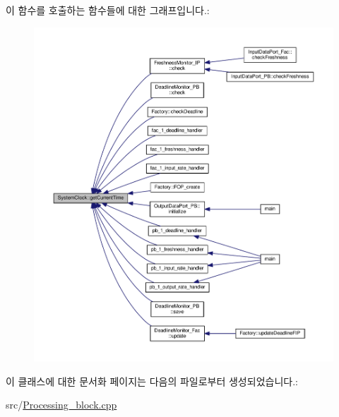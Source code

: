 이 함수를 호출하는 함수들에 대한 그래프입니다.\+:\nopagebreak
\begin{figure}[H]
\begin{center}
\leavevmode
\includegraphics[width=350pt]{classSystemClock_ac51adb5878772576050a1c70b8994244_icgraph}
\end{center}
\end{figure}




이 클래스에 대한 문서화 페이지는 다음의 파일로부터 생성되었습니다.\+:\begin{DoxyCompactItemize}
\item 
src/\hyperlink{Processing__block_8cpp}{Processing\+\_\+block.\+cpp}\end{DoxyCompactItemize}
